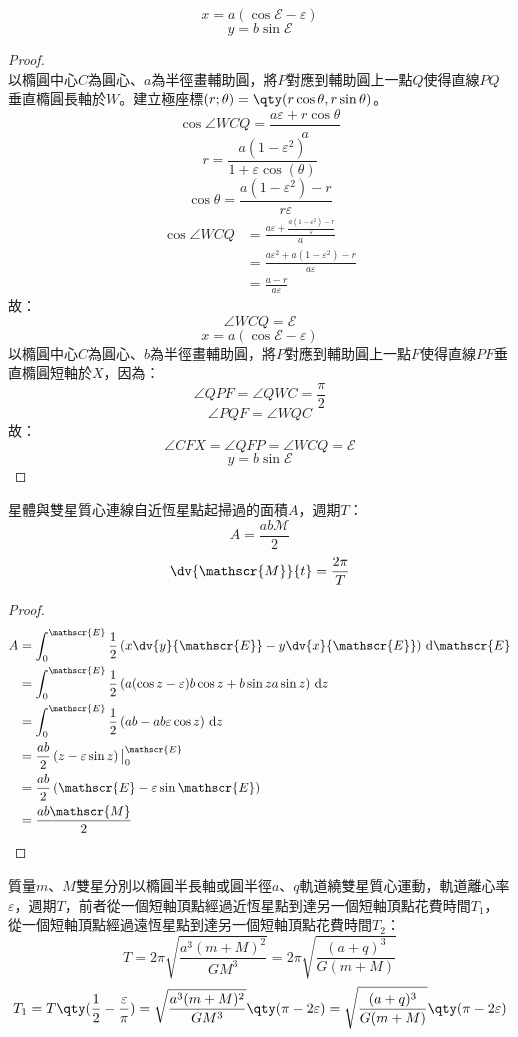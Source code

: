 \documentclass[a4paper,12pt]{article}
\begin{document}
\[x=a(\cos\mathscr{E}-\varepsilon)\]
\[y=b\sin\mathscr{E}\]
\begin{proof}\mbox{}\\
以橢圓中心$C$為圓心、$a$為半徑畫輔助圓，將$P$對應到輔助圓上一點$Q$使得直線$PQ$垂直橢圓長軸於$W$。建立極座標$(r;\theta)=\qty(r\cos\theta,r\sin\theta)$。
\[\cos\angle WCQ=\frac{a\varepsilon+r\cos\theta}{a}\]
\[r=\frac{a(1-\varepsilon^2)}{1+\varepsilon\cos(\theta)}\]
\[\cos\theta=\frac{a(1-\varepsilon^2)-r}{r\varepsilon}\]
\[\begin{aligned}
\cos\angle WCQ&=\frac{a\varepsilon+\frac{a(1-\varepsilon^2)-r}{\varepsilon}}{a}\\
&=\frac{a\varepsilon^2+a(1-\varepsilon^2)-r}{a\varepsilon}\\
&=\frac{a-r}{a\varepsilon}
\end{aligned}\]
故：
\[\angle WCQ=\mathscr{E}\]
\[x=a(\cos\mathscr{E}-\varepsilon)\]
以橢圓中心$C$為圓心、$b$為半徑畫輔助圓，將$P$對應到輔助圓上一點$F$使得直線$PF$垂直橢圓短軸於$X$，因為：
\[\angle QPF=\angle QWC=\frac{\pi}{2}\]
\[\angle PQF=\angle WQC\]
故：
\[\angle CFX=\angle QFP=\angle WCQ=\mathscr{E}\]
\[y=b\sin\mathscr{E}\]
\end{proof}
星體與雙星質心連線自近恆星點起掃過的面積$A$，週期$T$：
\[A=\frac{ab\mathscr{M}}{2}\]
\[\dv{\mathscr{M}}{t}=\frac{2\pi}{T}\]
\begin{proof}
\[\begin{aligned}
A&=\int_0^{\mathscr{E}}\frac{1}{2}\left(x\dv{y}{\mathscr{E}}-y\dv{x}{\mathscr{E}}\right)\,\mathrm{d}\mathscr{E}\\
&=\int_0^{\mathscr{E}}\frac{1}{2}\left(a(\cos z-\varepsilon)b\cos z+b\sin za\sin z\right)\,\mathrm{d}z\\
&=\int_0^{\mathscr{E}}\frac{1}{2}\left(ab-ab\varepsilon\cos z\right)\,\mathrm{d}z\\
&=\frac{ab}{2}\left(z-\varepsilon\sin z\right)\big\vert_0^{\mathscr{E}}\\
&=\frac{ab}{2}\left(\mathscr{E}-\varepsilon\sin\mathscr{E}\right)\\
&=\frac{ab\mathscr{M}}{2}
\end{aligned}\]
\end{proof}
質量$m$、$M$雙星分別以橢圓半長軸或圓半徑$a$、$q$軌道繞雙星質心運動，軌道離心率$\varepsilon$，週期$T$，前者從一個短軸頂點經過近恆星點到達另一個短軸頂點花費時間$T_1$，從一個短軸頂點經過遠恆星點到達另一個短軸頂點花費時間$T_2$：
\[T=2\pi\sqrt{\frac{a^3(m+M)^2}{GM^3}}=2\pi\sqrt{\frac{(a+q)^3}{G(m+M)}}\]
\[T_1=T\qty(\frac{1}{2}-\frac{\varepsilon}{\pi})=\sqrt{\frac{a^3(m+M)^2}{GM^3}}\qty(\pi-2\varepsilon)=\sqrt{\frac{(a+q)^3}{G(m+M)}}\qty(\pi-2\varepsilon)\]
\end{document}
